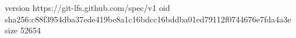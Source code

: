 version https://git-lfs.github.com/spec/v1
oid sha256:c88f3954dba37ede419be8a1c16bdcc16bddba01ed79112f0744676e7fda4a3e
size 52654
